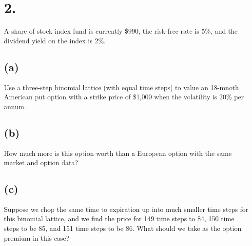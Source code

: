 \documentclass{article}
\begin{document}
\section*{2.}
{\Large


A share of stock index fund is currently \$990, the risk-free rate is 5\%, and the dividend yield on the index is 2\%.

\subsection*{(a)}

Use a three-step binomial lattice (with equal time steps) to value an 18-mnoth American put option with a strike price of \$1,000 when the volatility is 20\% per annum.

\subsection*{(b)}

How much more is this option worth than a European option with the same market and option data?

\subsection*{(c)}

Suppose we chop the same time to expiration up into much smaller time steps for this binomial lattice, and we find the price for 149 time steps to 84, 150 time steps to be 85, and 151 time steps to be 86. What should we take as the option premium in this case?



\newpage
}
\end{document}
